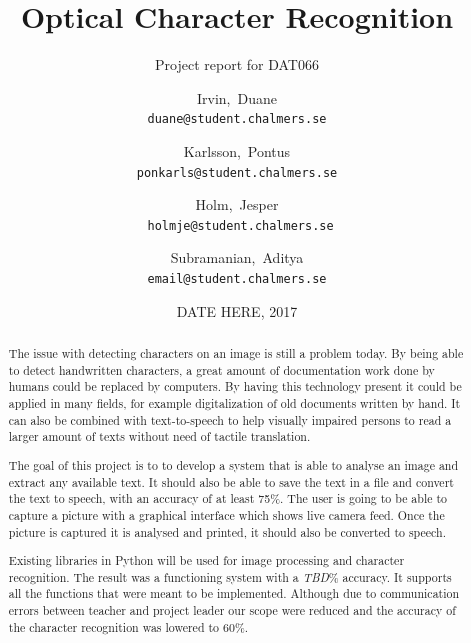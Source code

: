 \documentclass[a4paper, english, abstract=on]{scrartcl}
\begin{document}
\title{Optical Character Recognition}
\subtitle{Project report for DAT066}
\author{Irvin,~Duane \\ \texttt{duane@student.chalmers.se}
  \and Karlsson,~Pontus \\ \texttt{ponkarls@student.chalmers.se}
  \and Holm,~Jesper \\ \texttt{~holmje@student.chalmers.se}
  \and Subramanian,~Aditya \\ \texttt{email@student.chalmers.se}
}
\date{DATE HERE, 2017}


\clearpage\maketitle
\thispagestyle{empty}

\pagebreak


\begin{abstract}
The issue with detecting characters on an image is still a problem today. By
being able to detect handwritten characters, a great amount of documentation
work done by humans  could be replaced by computers. By having this technology
present it could be applied in many fields, for example digitalization of old
documents written by hand. It can also be combined with text-to-speech to help
visually impaired persons to read a larger amount of texts without need of
tactile translation. 

The goal of this project is to to develop a system that is  able to analyse an
image and extract any available text. It should also be able to save the text
in a file and convert the text to speech, with an accuracy of at least 75\%.
The user is going to be able to capture a picture with a graphical interface
which shows live camera feed. Once the picture is captured it is analysed and
printed, it should also be converted to speech.

Existing libraries in Python will be used for image processing and character
recognition. The result was a functioning system with a \textit{TBD}\%
accuracy. It supports all the functions that were meant to be implemented.
Although due to communication errors between teacher and project leader our
scope were reduced and the accuracy of the character recognition was lowered
to 60\%.
\end{abstract}
\thispagestyle{empty}

\pagebreak

\setcounter{page}{1}
\hypersetup{linkcolor=black}
\tableofcontents
\end{document}
